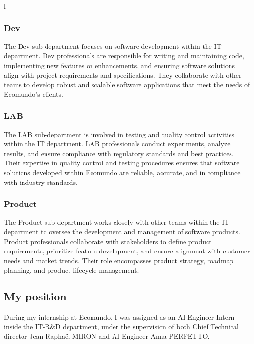 l\documentclass[a4paper,12pt,twoside]{report}
\begin{document}
\subsubsection{Dev}

The Dev sub-department focuses on software development within the IT department. Dev professionals are responsible for writing and maintaining code, implementing new features or enhancements, and ensuring software solutions align with project requirements and specifications. They collaborate with other teams to develop robust and scalable software applications that meet the needs of Ecomundo's clients.

\subsubsection{LAB}

The LAB sub-department is involved in testing and quality control activities within the IT department. LAB professionals conduct experiments, analyze results, and ensure compliance with regulatory standards and best practices. Their expertise in quality control and testing procedures ensures that software solutions developed within Ecomundo are reliable, accurate, and in compliance with industry standards.

\subsubsection{Product}

The Product sub-department works closely with other teams within the IT department to oversee the development and management of software products. Product professionals collaborate with stakeholders to define product requirements, prioritize feature development, and ensure alignment with customer needs and market trends. Their role encompasses product strategy, roadmap planning, and product lifecycle management.

\subsection{My position}
During my internship at Ecomundo, I was assigned as an AI Engineer Intern inside the  IT-R\&D department, under the supervision of both Chief Technical director Jean-Raphaël MIRON and AI Engineer Anna PERFETTO.
\end{document}
